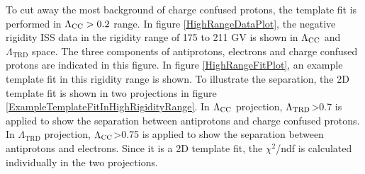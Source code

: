 \begin{comment}
\begin{table}[h]
\setlength\tabcolsep{15pt}
\centering
\caption{List of selections for templates}
\label{HighRigiditySelectionsForTemplates}
\begin{tabular}{cc}
\hline \textbf{Antiproton template}                         &  \textbf{Electron Template}                         \\
\hline         $-1<ECALBDT<0$                                 &  $0<ECALBDT$                                       \\
\hline         $\rm{TRDLikelihood_{P/He}} < 0.3$      &   $\rm{TRDLikelihood_{P/He}} < 0.3$      \\
\hline \textbf{Charge confused proton Template}  &  \textbf{Negative Rigidity Data}                  \\
\hline         $-1<ECALBDT<0$                                 &   $-2<ECALBDT<0$                                 \\
\hline         $\rm{TRDLikelihood_{P/He}} < 0.3$,     &   $\rm{TRDLikelihood_{P/He}} < 0.3$      \\
\hline
\end{tabular}
\end{table}
\end{comment}

To cut away the most background of charge confused protons, the template fit is performed in $\Lambda_{\rm{CC}}>0.2$ range. In figure \ref{HighRangeDataPlot}, the negative rigidity ISS data in the rigidity range of 175 to 211 GV is shown in $\Lambda_{\rm{CC}}$ and $\Lambda_\mathrm{TRD}$ space. The three components of antiprotons, electrons and charge confused protons are indicated in this figure. In figure \ref{HighRangeFitPlot}, an example template fit in this rigidity range is shown. To illustrate the separation, the 2D template fit is shown in two projections in figure \ref{ExampleTemplateFitInHighRigidityRange}. In $\Lambda_{\rm{CC}}$ projection, $\Lambda_{\rm{TRD}}$>0.7 is applied to show the separation between antiprotons and charge confused protons. In $\Lambda_\mathrm{TRD}$ projection, $\Lambda_{\rm{CC}}$>0.75 is applied to show the separation between antiprotons and electrons. Since it is a 2D template fit, the $\chi^2$/ndf is calculated individually in the two projections. \par

